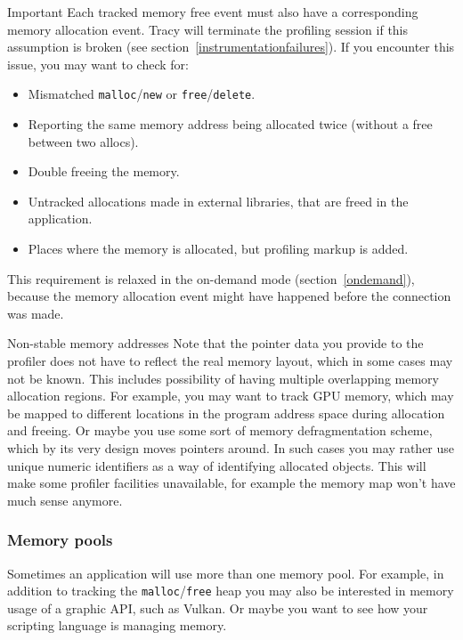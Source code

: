 \documentclass[hidelinks,titlepage,a4paper]{article}
\begin{document}
\begin{bclogo}[
noborder=true,
couleur=black!5,
logo=\bcbombe
]{Important}
Each tracked memory free event must also have a corresponding memory allocation event. Tracy will terminate the profiling session if this assumption is broken (see section~\ref{instrumentationfailures}). If you encounter this issue, you may want to check for:

\begin{itemize}
\item Mismatched \texttt{malloc}/\texttt{new} or \texttt{free}/\texttt{delete}.
\item Reporting the same memory address being allocated twice (without a free between two allocs).
\item Double freeing the memory.
\item Untracked allocations made in external libraries, that are freed in the application.
\item Places where the memory is allocated, but profiling markup is added.
\end{itemize}

This requirement is relaxed in the on-demand mode (section~\ref{ondemand}), because the memory allocation event might have happened before the connection was made.
\end{bclogo}

\begin{bclogo}[
noborder=true,
couleur=black!5,
logo=\bclampe
]{Non-stable memory addresses}
Note that the pointer data you provide to the profiler does not have to reflect the real memory layout, which in some cases may not be known. This includes possibility of having multiple overlapping memory allocation regions. For example, you may want to track GPU memory, which may be mapped to different locations in the program address space during allocation and freeing. Or maybe you use some sort of memory defragmentation scheme, which by its very design moves pointers around. In such cases you may rather use unique numeric identifiers as a way of identifying allocated objects. This will make some profiler facilities unavailable, for example the memory map won't have much sense anymore.
\end{bclogo}

\subsubsection{Memory pools}
\label{memorypools}

Sometimes an application will use more than one memory pool. For example, in addition to tracking the \texttt{malloc}/\texttt{free} heap you may also be interested in memory usage of a graphic API, such as Vulkan. Or maybe you want to see how your scripting language is managing memory.
\end{document}

